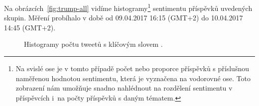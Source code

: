 \documentclass[12pt, a4paper]{article}
\numberwithin{equation}{section} 	%
\begin{document}
Na obrázcích~\autoref{fig:trump-all} vidíme histogramy\footnote{Na svislé ose je v tomto případě počet nebo proporce příspěvků s příslušnou naměřenou hodnotou sentimentu, která je vyznačena na vodorovné ose. Toto zobrazení nám umožňuje snadno nahlédnout na rozdělení sentimentu v příspěvcích i~na počty příspěvků s daným tématem.} sentimentu příspěvků uvedených skupin. Měření probíhalo v době od 09.04.2017 16:15 (GMT+2) do 10.04.2017 14:45 (GMT+2).
\begin{figure}[!h]
\centering
{}
\caption[]{Histogramy počtu tweetů s klíčovým slovem \textit{}.}
\label{fig:trump-all}
\end{figure}
\end{document}
